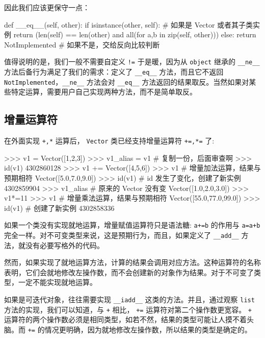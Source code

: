 因此我们应该更保守一点：
\begin{python}
def __eq__(self, other):
    if isinstance(other, self):     # 如果是 Vector 或者其子类实例
        return (len(self) == len(other) and all(for a,b in zip(self, other)))
    else:
        return NotImplemented       # 如果不是，交给反向比较判断
\end{python}

值得说明的是，我们一般不需要自定义 \texttt{!=} 于是暖，因为从 \texttt{object} 继承的 \texttt{\_\_ne\_\_} 方法后备行为满足了我们的需求：定义了 \texttt{\_\_eq\_\_} 方法，而且它不返回 \texttt{NotImplemented}，\texttt{\_\_ne\_\_} 方法会对 \texttt{\_\_eq\_\_} 方法返回的结果取反。当然如果对某些特定运算，需要用户自己实现两种方法，而不是简单取反。

\subsection{增量运算符}

在外面实现 \texttt{+,*} 运算后， \texttt{Vector} 类已经支持增量运算符 \texttt{+=,*=} 了:

\begin{python}
>>> v1 = Vector([1,2,3])
>>> v1_alias = v1           # 复制一份，后面审查啊
>>> id(v1)
4302860128
>>> v1 += Vector([4,5,6])
>>> v1                      # 增量加法运算，结果与预期相符
Vector([5.0,7.0,9.0])
>>> id(v1)                  # id 发生了变化，创建了新实例
4302859904
>>> v1_alias                # 原来的 Vector 没有变
Vector([1.0,2.0,3.0])
>>> v1*=11
>>> v1                      # 增量乘法运算，结果与预期相符
Vector([55.0,77.0,99.0])
>>> id(v1)                  # 创建了新实例
4302858336
\end{python}

如果一个类没有实现就地运算，增量赋值运算符只是语法糖: \texttt{a+=b} 的作用与 \texttt{a=a+b} 完全一样。对不可变类型来说，这是预期行为，而且，如果定义了 \texttt{\_\_add\_\_} 方法，就没有必要写格外的代码。

然而，如果实现了就地运算方法，计算的结果会调用对应方法。这种运算符的名称表明，它们会就地修改左操作数，而不会创建新的对象作为结果。对于不可变了类型，一定不能实现就地运算。

如果是可迭代对象，往往需要实现 \texttt{\_\_iadd\_\_} 这类的方法。并且，通过观察 \texttt{list} 方法的实现，我们可以知道，与 \texttt{+} 相比， \texttt{+=} 运算符对第二个操作数更宽容。 \texttt{+} 运算符的两个操作数必须是相同类型，如若不然，结果的类型可能让人摸不着头脑。而 \texttt{+=} 的情况更明确，因为就地修改左操作数，所以结果的类型是确定的。

